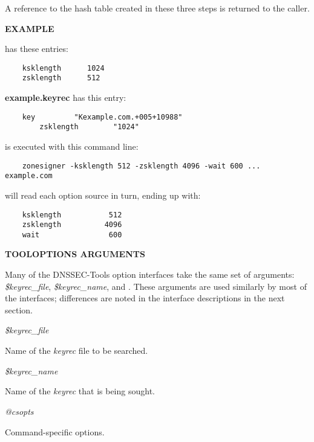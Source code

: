 A reference to the hash table created in these three steps is returned to the
caller.


{\bf EXAMPLE}

 has these entries:

\begin{verbatim}
    ksklength      1024
    zsklength      512
\end{verbatim}

{\bf example.keyrec} has this entry:

\begin{verbatim}
    key         "Kexample.com.+005+10988"
        zsklength        "1024"
\end{verbatim}

 is executed with this command line:

\begin{verbatim}
    zonesigner -ksklength 512 -zsklength 4096 -wait 600 ...  example.com
\end{verbatim}

will read each option source in turn, ending up with:

\begin{verbatim}
    ksklength           512
    zsklength          4096
    wait                600
\end{verbatim}

{\bf TOOLOPTIONS ARGUMENTS}

Many of the DNSSEC-Tools option interfaces take the same set of arguments:
{\it \$keyrec\_file}, {\it \$keyrec\_name}, and {\it \@csopts}.  These arguments
are used similarly by most of the interfaces; differences are noted in the
interface descriptions in the next section.

\begin{description}

\item {\it \$keyrec\_file}\verb" "

Name of the {\it keyrec} file to be searched.

\item {\it \$keyrec\_name}\verb" "

Name of the {\it keyrec} that is being sought.

\item {\it @csopts}\verb" "

Command-specific options.

\end{description}

